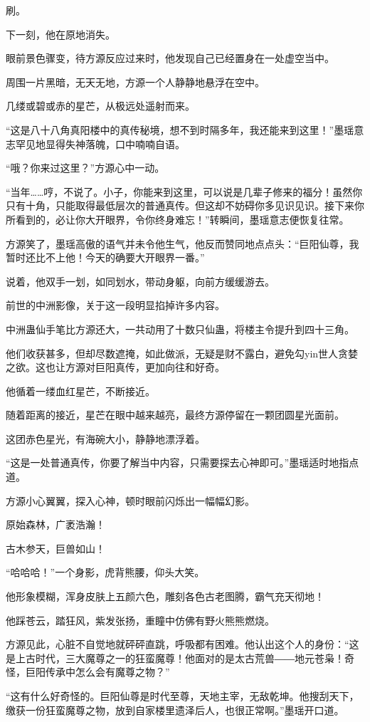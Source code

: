 \begin{this_body}
刷。

下一刻，他在原地消失。

眼前景色骤变，待方源反应过来时，他发现自己已经置身在一处虚空当中。

周围一片黑暗，无天无地，方源一个人静静地悬浮在空中。

几缕或碧或赤的星芒，从极远处遥射而来。

“这是八十八角真阳楼中的真传秘境，想不到时隔多年，我还能来到这里！”墨瑶意志罕见地显得失神落魄，口中喃喃自语。

“哦？你来过这里？”方源心中一动。

“当年……哼，不说了。小子，你能来到这里，可以说是几辈子修来的福分！虽然你只有十角，只能取得最低层次的普通真传。但这却不妨碍你多见识见识。接下来你所看到的，必让你大开眼界，令你终身难忘！”转瞬间，墨瑶意志便恢复往常。

方源笑了，墨瑶高傲的语气并未令他生气，他反而赞同地点点头：“巨阳仙尊，我暂时还比不上他！今天的确要大开眼界一番。”

说着，他双手一划，如同划水，带动身躯，向前方缓缓游去。

前世的中洲影像，关于这一段明显掐掉许多内容。

中洲蛊仙手笔比方源还大，一共动用了十数只仙蛊，将楼主令提升到四十三角。

他们收获甚多，但却尽数遮掩，如此做派，无疑是财不露白，避免勾yin世人贪婪之欲。这也让方源对巨阳真传，更加向往和好奇。

他循着一缕血红星芒，不断接近。

随着距离的接近，星芒在眼中越来越亮，最终方源停留在一颗团圆星光面前。

这团赤色星光，有海碗大小，静静地漂浮着。

“这是一处普通真传，你要了解当中内容，只需要探去心神即可。”墨瑶适时地指点道。

方源小心翼翼，探入心神，顿时眼前闪烁出一幅幅幻影。

原始森林，广袤浩瀚！

古木参天，巨兽如山！

“哈哈哈！”一个身影，虎背熊腰，仰头大笑。

他形象模糊，浑身皮肤上五颜六色，雕刻各色古老图腾，霸气充天彻地！

他踩苍云，踏狂风，紫发张扬，重瞳中仿佛有野火熊熊燃烧。

方源见此，心脏不自觉地就砰砰直跳，呼吸都有困难。他认出这个人的身份：“这是上古时代，三大魔尊之一的狂蛮魔尊！他面对的是太古荒兽――地元苍枭！奇怪，巨阳传承中怎么会有魔尊之物？”

“这有什么好奇怪的。巨阳仙尊是时代至尊，天地主宰，无敌乾坤。他搜刮天下，缴获一份狂蛮魔尊之物，放到自家楼里遗泽后人，也很正常啊。”墨瑶开口道。


\end{this_body}
